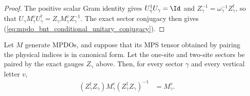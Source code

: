 \begin{proof}\leanok
    The positive scalar Gram identity gives
    $U_\gamma^\dagger U_\gamma=\Id$ and
    $Z_\gamma^{-1}=\omega_\gamma^{-1}Z_\gamma^\dagger$, so that
    $U_\gamma M_\gamma^vU_\gamma^\dagger
        =Z_\gamma M_\gamma^vZ_\gamma^{-1}$.
    The exact sector conjugacy then gives
    (\ref{eq:mpdo_bnt_conditional_unitary_conjugacy}).
\end{proof}

\begin{lemma}
    \label{thm:mpdo_bnt_mixed_prefix_unitary_sector_conjugacy}
    \leanok
    Let $M$ generate MPDOs, and suppose that its MPS tensor obtained by
    pairing the physical indices is in canonical form. Let the one-site and two-site
    sectors be paired by the exact gauges $Z_\gamma$ above.
    Then, for every sector $\gamma$ and every vertical letter $v$,
    \begin{align}
        (Z_\gamma^\dagger Z_\gamma)M_\gamma^v
        (Z_\gamma^\dagger Z_\gamma)^{-1}
         & =M_\gamma^v.
        \label{eq:mpdo_bnt_mixed_prefix_gram_identity}
    \end{align}
    \begin{center}
        \tenkzkernel
        \begin{tenkz}[rows={wire}, cols=3, west=open, east=open]

\end{tenkz}
\end{center}
\end{lemma}
